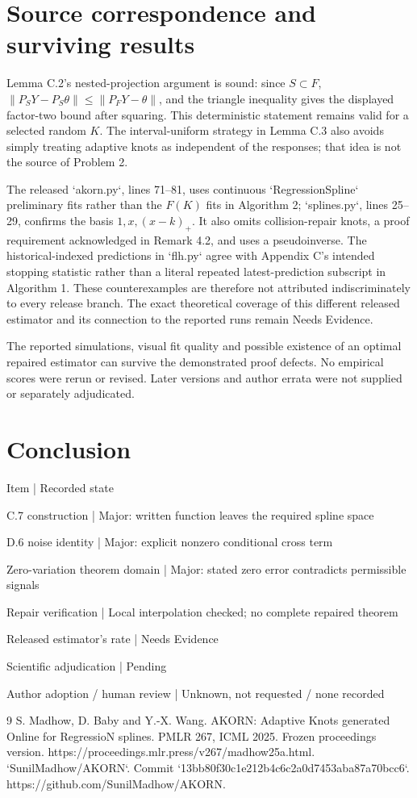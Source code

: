 \documentclass[10pt]{article}
\begin{document}
\section*{Source correspondence and surviving results}
Lemma C.2’s nested-projection argument is sound: since \(S\subset F\), \(\|P_SY-P_S\theta\|\le\|P_FY-\theta\|\), and the triangle inequality gives the displayed factor-two bound after squaring. This deterministic statement remains valid for a selected random \(K\). The interval-uniform strategy in Lemma C.3 also avoids simply treating adaptive knots as independent of the responses; that idea is not the source of Problem 2.\par
The released `akorn.py`, lines 71–81, uses continuous `RegressionSpline` preliminary fits rather than the \(F(K)\) fits in Algorithm 2; `splines.py`, lines 25–29, confirms the basis \(1,x,(x-k)_+\). It also omits collision-repair knots, a proof requirement acknowledged in Remark 4.2, and uses a pseudoinverse. The historical-indexed predictions in `flh.py` agree with Appendix C’s intended stopping statistic rather than a literal repeated latest-prediction subscript in Algorithm 1. These counterexamples are therefore not attributed indiscriminately to every release branch. The exact theoretical coverage of this different released estimator and its connection to the reported runs remain Needs Evidence.\par
The reported simulations, visual fit quality and possible existence of an optimal repaired estimator can survive the demonstrated proof defects. No empirical scores were rerun or revised. Later versions and author errata were not supplied or separately adjudicated.\par
\section*{Conclusion}
Item | Recorded state\par
C.7 construction | Major: written function leaves the required spline space\par
D.6 noise identity | Major: explicit nonzero conditional cross term\par
Zero-variation theorem domain | Major: stated zero error contradicts permissible signals\par
Repair verification | Local interpolation checked; no complete repaired theorem\par
Released estimator’s rate | Needs Evidence\par
Scientific adjudication | Pending\par
Author adoption / human review | Unknown, not requested / none recorded\par
9 S. Madhow, D. Baby and Y.-X. Wang. AKORN: Adaptive Knots generated Online for RegressioN splines. PMLR 267, ICML 2025. Frozen proceedings version. https://proceedings.mlr.press/v267/madhow25a.html. `SunilMadhow/AKORN`. Commit `13bb80f30c1e212b4c6c2a0d7453aba87a70bcc6`. https://github.com/SunilMadhow/AKORN.\par
\end{document}
